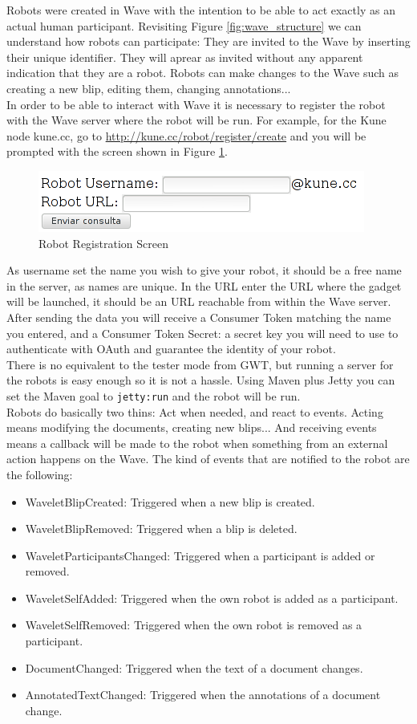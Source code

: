 Robots were created in Wave with the intention to be able to act exactly as an actual human participant. Revisiting Figure \ref{fig:wave_structure} we can understand how robots can participate: They are invited to the Wave by inserting their unique identifier. They will aprear as invited without any apparent indication that they are a robot. Robots can make changes to the Wave such as creating a new blip, editing them, changing annotations...\\[.2cm]
In order to be able to interact with Wave it is necessary to register the robot with the Wave server where the robot will be run. For example, for the Kune node kune.cc, go to \url{http://kune.cc/robot/register/create} and you will be prompted with the screen shown in Figure \ref{fig:robot_register}.
\begin{figure}[H]
  \center
    \includegraphics[keepaspectratio, scale=0.6]{Media/Captures/Wave/RegisterRobot.png}
  \caption{Robot Registration Screen}
  \label{fig:robot_register}
\end{figure}
As username set the name you wish to give your robot, it should be a free name in the server, as names are unique. In the URL enter the URL where the gadget will be launched, it should be an URL reachable from within the Wave server. After sending the data you will receive a Consumer Token matching the name you entered, and a Consumer Token Secret: a secret key you will need to use to authenticate with OAuth and guarantee the identity of your robot.\\[.2cm]
There is no equivalent to the tester mode from GWT, but running a server for the robots is easy enough so it is not a hassle. Using Maven plus Jetty you can set the Maven goal to \verb|jetty:run| and the robot will be run.\\[.2cm]
Robots do basically two thins: Act when needed, and react to events. Acting means modifying the documents, creating new blips... And receiving events means a callback will be made to the robot when something from an external action happens on the Wave. The kind of events that are notified to the robot are the following:
\begin{itemize}
  \item WaveletBlipCreated: Triggered when a new blip is created.
  \item WaveletBlipRemoved: Triggered when a blip is deleted.
  \item WaveletParticipantsChanged: Triggered when a participant is added or removed.
  \item WaveletSelfAdded: Triggered when the own robot is added as a participant.
  \item WaveletSelfRemoved: Triggered when the own robot is removed as a participant.
  \item DocumentChanged: Triggered when the text of a document changes.
  \item AnnotatedTextChanged: Triggered when the annotations of a document change.
\end{itemize}

